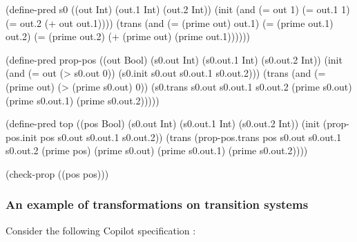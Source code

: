 \begin{code}
(define-pred s0
  ((out Int)
   (out.1 Int)
   (out.2 Int))
  (init
    (and
      (= out 1)
      (= out.1 1)
      (= out.2
        (+ out out.1))))
  (trans
    (and
      (= (prime out) out.1)
      (= (prime out.1) out.2)
      (= (prime out.2)
        (+ (prime out) (prime out.1))))))

(define-pred prop-pos
  ((out Bool)
   (s0.out Int)
   (s0.out.1 Int)
   (s0.out.2 Int))
  (init
    (and
      (= out
        (> s0.out 0))
      (s0.init s0.out s0.out.1 s0.out.2)))
  (trans
    (and
      (= (prime out)
        (> (prime s0.out) 0))
      (s0.trans s0.out s0.out.1 s0.out.2 (prime s0.out) (prime s0.out.1) (prime s0.out.2)))))

(define-pred top
  ((pos Bool)
   (s0.out Int)
   (s0.out.1 Int)
   (s0.out.2 Int))
  (init
    (prop-pos.init pos s0.out s0.out.1 s0.out.2))
  (trans
    (prop-pos.trans pos s0.out s0.out.1 s0.out.2 (prime pos) (prime s0.out) (prime s0.out.1) (prime s0.out.2))))

(check-prop
  ((pos pos)))
\end{code}



\subsubsection{An example of transformations on transition systems}


Consider the following Copilot specification : 

